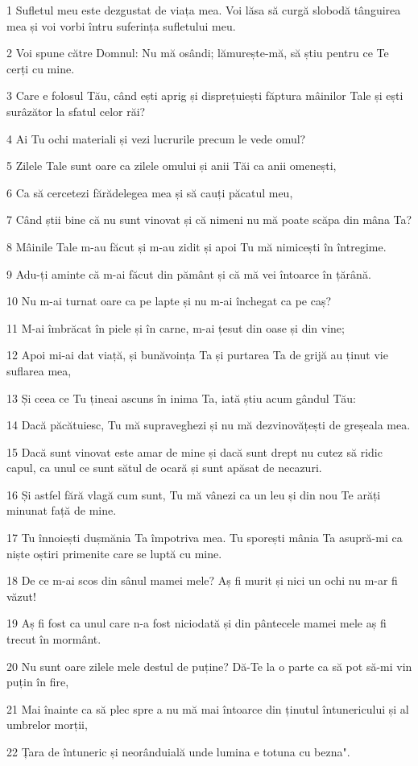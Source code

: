 \par 1 Sufletul meu este dezgustat de viața mea. Voi lăsa să curgă slobodă tânguirea mea și voi vorbi întru suferința sufletului meu.
\par 2 Voi spune către Domnul: Nu mă osândi; lămurește-mă, să știu pentru ce Te cerți cu mine.
\par 3 Care e folosul Tău, când ești aprig și disprețuiești făptura mâinilor Tale și ești surâzător la sfatul celor răi?
\par 4 Ai Tu ochi materiali și vezi lucrurile precum le vede omul?
\par 5 Zilele Tale sunt oare ca zilele omului și anii Tăi ca anii omenești,
\par 6 Ca să cercetezi fărădelegea mea și să cauți păcatul meu,
\par 7 Când știi bine că nu sunt vinovat și că nimeni nu mă poate scăpa din mâna Ta?
\par 8 Mâinile Tale m-au făcut și m-au zidit și apoi Tu mă nimicești în întregime.
\par 9 Adu-ți aminte că m-ai făcut din pământ și că mă vei întoarce în țărână.
\par 10 Nu m-ai turnat oare ca pe lapte și nu m-ai închegat ca pe caș?
\par 11 M-ai îmbrăcat în piele și în carne, m-ai țesut din oase și din vine;
\par 12 Apoi mi-ai dat viață, și bunăvoința Ta și purtarea Ta de grijă au ținut vie suflarea mea,
\par 13 Și ceea ce Tu țineai ascuns în inima Ta, iată știu acum gândul Tău:
\par 14 Dacă păcătuiesc, Tu mă supraveghezi și nu mă dezvinovățești de greșeala mea.
\par 15 Dacă sunt vinovat este amar de mine și dacă sunt drept nu cutez să ridic capul, ca unul ce sunt sătul de ocară și sunt apăsat de necazuri.
\par 16 Și astfel fără vlagă cum sunt, Tu mă vânezi ca un leu și din nou Te arăți minunat față de mine.
\par 17 Tu înnoiești dușmănia Ta împotriva mea. Tu sporești mânia Ta asupră-mi ca niște oștiri primenite care se luptă cu mine.
\par 18 De ce m-ai scos din sânul mamei mele? Aș fi murit și nici un ochi nu m-ar fi văzut!
\par 19 Aș fi fost ca unul care n-a fost niciodată și din pântecele mamei mele aș fi trecut în mormânt.
\par 20 Nu sunt oare zilele mele destul de puține? Dă-Te la o parte ca să pot să-mi vin puțin în fire,
\par 21 Mai înainte ca să plec spre a nu mă mai întoarce din ținutul întunericului și al umbrelor morții,
\par 22 Țara de întuneric și neorânduială unde lumina e totuna cu bezna".

